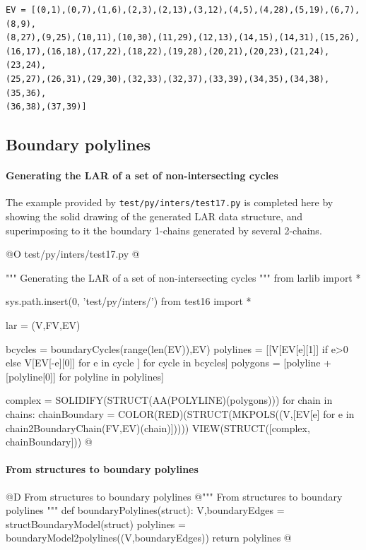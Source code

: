 \documentclass[11pt,oneside]{article}    %
\begin{document}
\begin{verbatim}
EV = [(0,1),(0,7),(1,6),(2,3),(2,13),(3,12),(4,5),(4,28),(5,19),(6,7),(8,9),
(8,27),(9,25),(10,11),(10,30),(11,29),(12,13),(14,15),(14,31),(15,26),
(16,17),(16,18),(17,22),(18,22),(19,28),(20,21),(20,23),(21,24),(23,24),
(25,27),(26,31),(29,30),(32,33),(32,37),(33,39),(34,35),(34,38),(35,36),
(36,38),(37,39)]
\end{verbatim}



\subsection{Boundary polylines}

\paragraph{Generating the LAR of a set of non-intersecting cycles}
The example provided by \texttt{test/py/inters/test17.py} is completed here
by showing the solid drawing of the generated LAR data structure, and superimposing to it 
the boundary 1-chains generated by several 2-chains.

@O test/py/inters/test17.py
@{""" Generating the LAR of a set of non-intersecting cycles """
from larlib import *

sys.path.insert(0, 'test/py/inters/')
from test16 import *

lar = (V,FV,EV)

bcycles = boundaryCycles(range(len(EV)),EV)
polylines = [[V[EV[e][1]] if e>0 else V[EV[-e][0]] for e in cycle ] for cycle in bcycles]
polygons = [polyline + [polyline[0]] for polyline in polylines]

complex = SOLIDIFY(STRUCT(AA(POLYLINE)(polygons)))
for chain in chains:
    chainBoundary = COLOR(RED)(STRUCT(MKPOLS((V,[EV[e] 
                        for e in chain2BoundaryChain(FV,EV)(chain)]))))
    VIEW(STRUCT([complex, chainBoundary]))
@}




\paragraph{From structures to boundary polylines}
@D From structures to boundary polylines
@{""" From structures to boundary polylines """
def boundaryPolylines(struct):
    V,boundaryEdges = structBoundaryModel(struct)
    polylines = boundaryModel2polylines((V,boundaryEdges))
    return polylines
@}
\end{document}
